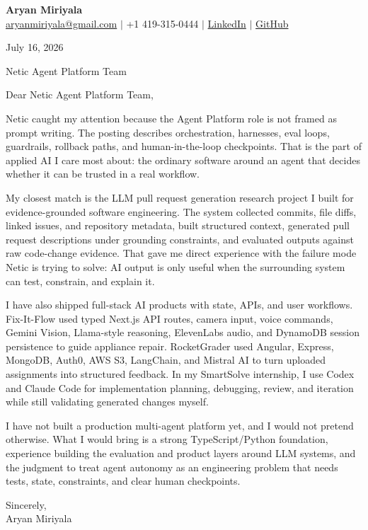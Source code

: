 \documentclass[letterpaper,11pt]{article}
\begin{document}
{\Large\textbf{Aryan Miriyala}}\\
\href{mailto:aryanmiriyala@gmail.com}{aryanmiriyala@gmail.com} $|$ +1 419-315-0444 $|$
\href{https://www.linkedin.com/in/aryan-miriyala-7788a21b6/}{LinkedIn} $|$
\href{https://github.com/aryanmiriyala}{GitHub}

July 16, 2026

Netic Agent Platform Team

Dear Netic Agent Platform Team,

Netic caught my attention because the Agent Platform role is not framed as prompt writing. The posting describes orchestration, harnesses, eval loops, guardrails, rollback paths, and human-in-the-loop checkpoints. That is the part of applied AI I care most about: the ordinary software around an agent that decides whether it can be trusted in a real workflow.

My closest match is the LLM pull request generation research project I built for evidence-grounded software engineering. The system collected commits, file diffs, linked issues, and repository metadata, built structured context, generated pull request descriptions under grounding constraints, and evaluated outputs against raw code-change evidence. That gave me direct experience with the failure mode Netic is trying to solve: AI output is only useful when the surrounding system can test, constrain, and explain it.

I have also shipped full-stack AI products with state, APIs, and user workflows. Fix-It-Flow used typed Next.js API routes, camera input, voice commands, Gemini Vision, Llama-style reasoning, ElevenLabs audio, and DynamoDB session persistence to guide appliance repair. RocketGrader used Angular, Express, MongoDB, Auth0, AWS S3, LangChain, and Mistral AI to turn uploaded assignments into structured feedback. In my SmartSolve internship, I use Codex and Claude Code for implementation planning, debugging, review, and iteration while still validating generated changes myself.

I have not built a production multi-agent platform yet, and I would not pretend otherwise. What I would bring is a strong TypeScript/Python foundation, experience building the evaluation and product layers around LLM systems, and the judgment to treat agent autonomy as an engineering problem that needs tests, state, constraints, and clear human checkpoints.

Sincerely,\\
Aryan Miriyala
\end{document}
